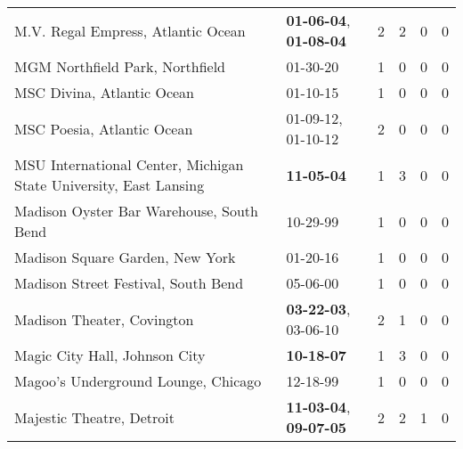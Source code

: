 \begin{longtable}{p{}p{}p{}p{}p{}p{}}
                                           M.V. Regal Empress, Atlantic Ocean &  \textbf{01-06-04\textsuperscript{}}, \textbf{01-08-04\textsuperscript{}} &  2 &  2 &  0 &  0 \\
                                              MGM Northfield Park, Northfield &                                                01-30-20\textsuperscript{} &  1 &  0 &  0 &  0 \\
                                                   MSC Divina, Atlantic Ocean &                                                01-10-15\textsuperscript{} &  1 &  0 &  0 &  0 \\
                                                   MSC Poesia, Atlantic Ocean &                    01-09-12\textsuperscript{}, 01-10-12\textsuperscript{} &  2 &  0 &  0 &  0 \\
            MSU International Center, Michigan State University, East Lansing &                                       \textbf{11-05-04\textsuperscript{}} &  1 &  3 &  0 &  0 \\
                                     Madison Oyster Bar Warehouse, South Bend &                                                10-29-99\textsuperscript{} &  1 &  0 &  0 &  0 \\
                                              Madison Square Garden, New York &                                                01-20-16\textsuperscript{} &  1 &  0 &  0 &  0 \\
                                          Madison Street Festival, South Bend &                                                05-06-00\textsuperscript{} &  1 &  0 &  0 &  0 \\
                                                   Madison Theater, Covington &           \textbf{03-22-03\textsuperscript{}}, 03-06-10\textsuperscript{} &  2 &  1 &  0 &  0 \\
                                                Magic City Hall, Johnson City &                                       \textbf{10-18-07\textsuperscript{}} &  1 &  3 &  0 &  0 \\
                                          Magoo's Underground Lounge, Chicago &                                                12-18-99\textsuperscript{} &  1 &  0 &  0 &  0 \\
                                                    Majestic Theatre, Detroit &  \textbf{11-03-04\textsuperscript{}}, \textbf{09-07-05\textsuperscript{}} &  2 &  2 &  1 &  0 \\

\end{longtable}
